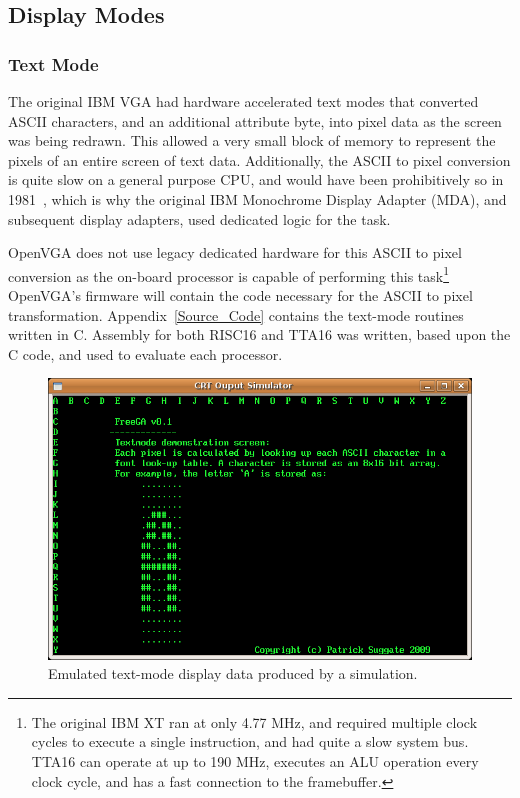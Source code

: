 \subsection{Display Modes}

\subsubsection{Text Mode}
The original IBM VGA had hardware accelerated text modes that converted ASCII
characters, and an additional attribute byte, into pixel data as the screen was
being redrawn. This allowed a very small block of memory to represent the pixels
of an entire screen of text data. Additionally, the ASCII to pixel conversion is
quite slow on a general purpose CPU, and would have been prohibitively so in
1981~\cite{VGA_Programmers}, which is why the original IBM Monochrome Display
Adapter (MDA), and subsequent display adapters, used dedicated logic for the
task.

OpenVGA does not use legacy dedicated hardware for this ASCII to pixel conversion
as the on-board processor is capable of performing this task\footnote{The
original IBM XT ran at only 4.77 MHz, and required multiple clock cycles to
execute a single instruction, and had quite a slow system bus\cite{SVGA_Book}.
TTA16 can operate at up to 190 MHz, executes an ALU operation every clock cycle,
and has a fast connection to the framebuffer.} OpenVGA's firmware will contain
the code necessary for the ASCII to pixel transformation.
Appendix~\ref{Source_Code} contains the text-mode routines written in C. Assembly
for both RISC16 and TTA16 was written, based upon the C code, and used to
evaluate each processor.

\begin{figure}[h!]
\begin{center}
\includegraphics[width=\linewidth]{images/crt_sim.png}
\caption[Emulated text-mode display data produced by a simulation]{Emulated
text-mode display data produced by a simulation.}
\label{CRT_Sim}
\end{center}
\end{figure}

